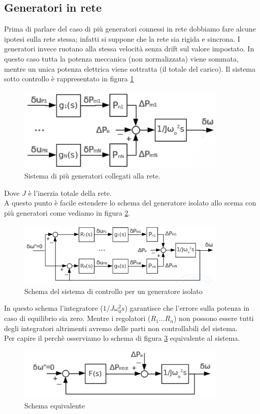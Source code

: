 \subsection{Generatori in rete}
Prima di parlare del caso di più generatori connessi in rete dobbiamo fare alcune ipotesi sulla rete stessa; infatti si suppone che la rete sia rigida e sincrona. I generatori invece ruotano alla stessa velocità senza drift sul valore impostato.
In questo caso tutta la potenza meccanica (non normalizzata) viene sommata, mentre un unica potenza elettrica viene sottratta (il totale del carico). Il sistema sotto controllo è rappresentato in figura \ref{fig:gennetwork}
\begin{figure}[htb]
\centering
\includegraphics[width=10cm]{img/gennetwork.png}
\caption{Sistema di più generatori collegati alla 
rete.}
\label{fig:gennetwork}
\end{figure}
Dove $J$ è l'inerzia totale della rete.\\
A questo punto è facile estendere lo schema del generatore isolato allo scema con più generatori come vediamo in figura \ref{fig:netcontrol}.
\begin{figure}[htb]
\centering
\includegraphics[width=10cm]{img/netcontrol.png}
\caption{Schema del sistema di controllo per un generatore isolato}
\label{fig:netcontrol}
\end{figure}
In questo schema l'integratore ($1/J\omega_0^2s$) garantisce che l'errore sulla potenza in caso di equilibrio sia zero. Mentre i regolatori ($R_1\dots R_n$) non possono essere tutti degli integratori altrimenti avremo delle parti non controllabili del sistema.\\
Per capire il perchè osserviamo lo schema di figura \ref{fig:schema} equivalente al sistema.
\begin{figure}[htb]
\centering
\includegraphics[width=10cm]{img/schema.png}
\caption{Schema equivalente}
\label{fig:schema}
\end{figure} 

